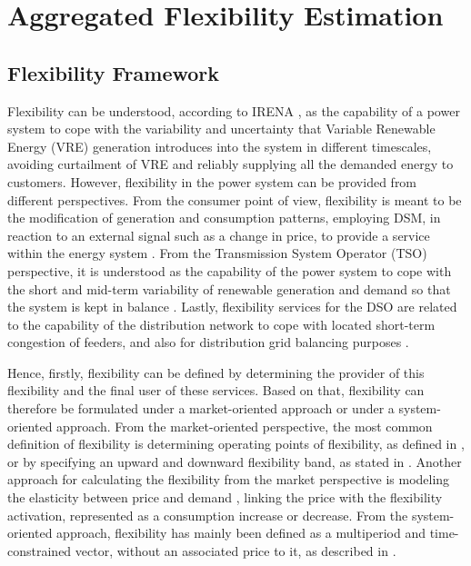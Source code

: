\section{Aggregated Flexibility Estimation}\label{Sect:ProblemStatement}
\subsection{Flexibility Framework}
Flexibility can be understood, according to IRENA \cite{IRENA2018}, as the capability of a power system to cope with the variability and uncertainty that Variable Renewable Energy (VRE) generation introduces into the system in different timescales, avoiding curtailment of VRE and reliably supplying all the demanded energy to customers.  
However, flexibility in the power system can be provided from different perspectives. From the consumer point of view, flexibility is meant to be the modification of generation and consumption patterns, employing DSM, in reaction to an external signal such as a change in price, to provide a service within the energy system \cite{OfficeofGasandElectricityMarketsOfgem2015}. From the Transmission System Operator (TSO) perspective, it is understood as the capability of the power system to cope with the short and mid-term variability of renewable generation and demand so that the system is kept in balance \cite{Profumo2016}. Lastly, flexibility services for the DSO are related to the capability of the distribution network to cope with located short-term congestion of feeders, and also for distribution grid balancing purposes \cite{Minniti_2018, Khatami2018}. 

Hence, firstly, flexibility can be defined by determining the provider of this flexibility and the final user of these services. Based on that, flexibility can therefore be formulated under a market-oriented approach or under a system-oriented approach. From the market-oriented perspective, the most common definition of flexibility is determining operating points of flexibility, as defined in \cite{Olivella-Rosell2018}, or by specifying an upward and downward flexibility band, as stated in \cite{Soares2017}. Another approach for calculating the flexibility from the market perspective is modeling the elasticity between price and demand \cite{Gorria2013}, linking the price with the flexibility activation, represented as a consumption increase or decrease. From the system-oriented approach, flexibility has mainly been defined as a multiperiod and time-constrained vector, without an associated price to it, as described in \cite{Pinto2017}. 

